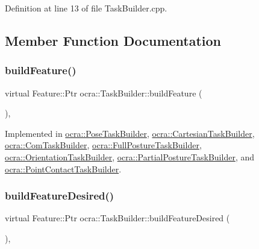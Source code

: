 Definition at line 13 of file Task\+Builder.\+cpp.



\subsection{Member Function Documentation}
\hypertarget{classocra_1_1TaskBuilder_a58c0dc416a9607a344a080248ee26ac2}{}\label{classocra_1_1TaskBuilder_a58c0dc416a9607a344a080248ee26ac2} 
\subsubsection{\texorpdfstring{build\+Feature()}{buildFeature()}}
{\footnotesize\ttfamily virtual Feature\+::\+Ptr ocra\+::\+Task\+Builder\+::build\+Feature (\begin{DoxyParamCaption}{ }\end{DoxyParamCaption})\hspace{0.3cm}{\ttfamily [protected]}, {}}



Implemented in \hyperlink{classocra_1_1PoseTaskBuilder_a9a5cd51010fb610f00eea794e1f8f701}{ocra\+::\+Pose\+Task\+Builder}, \hyperlink{classocra_1_1CartesianTaskBuilder_a58c8e4a299db03180c058eefcd711052}{ocra\+::\+Cartesian\+Task\+Builder}, \hyperlink{classocra_1_1ComTaskBuilder_aa4e0d21159da91788a1d2806ddca84da}{ocra\+::\+Com\+Task\+Builder}, \hyperlink{classocra_1_1FullPostureTaskBuilder_a7651ca4fd2ef7c8096a399b128981122}{ocra\+::\+Full\+Posture\+Task\+Builder}, \hyperlink{classocra_1_1OrientationTaskBuilder_a38d5badfcdbcdbc745f305e38af8b737}{ocra\+::\+Orientation\+Task\+Builder}, \hyperlink{classocra_1_1PartialPostureTaskBuilder_ab4a80855ccc820bbeabf4eed87487784}{ocra\+::\+Partial\+Posture\+Task\+Builder}, and \hyperlink{classocra_1_1PointContactTaskBuilder_a220c35d105a88cd0e2407779ab1556f2}{ocra\+::\+Point\+Contact\+Task\+Builder}.

\hypertarget{classocra_1_1TaskBuilder_a7a2c8bcc5d95160d0e48806a2648f1a5}{}\label{classocra_1_1TaskBuilder_a7a2c8bcc5d95160d0e48806a2648f1a5} 
\subsubsection{\texorpdfstring{build\+Feature\+Desired()}{buildFeatureDesired()}}
{\footnotesize\ttfamily virtual Feature\+::\+Ptr ocra\+::\+Task\+Builder\+::build\+Feature\+Desired (\begin{DoxyParamCaption}{ }\end{DoxyParamCaption})\hspace{0.3cm}{\ttfamily [protected]}, {}}



